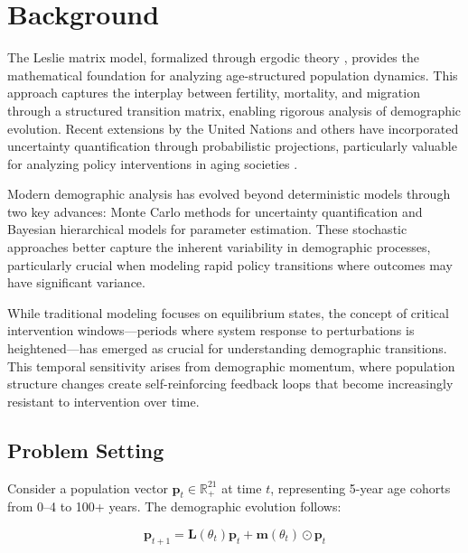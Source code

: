\documentclass{article} %
\begin{document}
\section{Background}
\label{sec:background}

The Leslie matrix model, formalized through ergodic theory \citep{Cohen1979ErgodicTO}, provides the mathematical foundation for analyzing age-structured population dynamics. This approach captures the interplay between fertility, mortality, and migration through a structured transition matrix, enabling rigorous analysis of demographic evolution. Recent extensions by the United Nations \citep{Alkema2015TheUN} and others have incorporated uncertainty quantification through probabilistic projections, particularly valuable for analyzing policy interventions in aging societies \citep{Oizumi2022SensitivityAO}.

Modern demographic analysis has evolved beyond deterministic models through two key advances: Monte Carlo methods for uncertainty quantification \citep{Osés-Arranz2017ProbabilisticPP, ho2020StochasticPP} and Bayesian hierarchical models for parameter estimation. These stochastic approaches better capture the inherent variability in demographic processes, particularly crucial when modeling rapid policy transitions where outcomes may have significant variance.

While traditional modeling focuses on equilibrium states, the concept of critical intervention windows---periods where system response to perturbations is heightened---has emerged as crucial for understanding demographic transitions. This temporal sensitivity arises from demographic momentum, where population structure changes create self-reinforcing feedback loops that become increasingly resistant to intervention over time.

\subsection{Problem Setting}
\label{subsec:problem}

Consider a population vector $\mathbf{p}_t \in \mathbb{R}^{21}_{+}$ at time $t$, representing 5-year age cohorts from 0--4 to 100+ years. The demographic evolution follows:

\begin{equation}
\mathbf{p}_{t+1} = \mathbf{L}(\theta_t)\mathbf{p}_t + \mathbf{m}(\theta_t)\odot\mathbf{p}_t
\end{equation}
\end{document}
